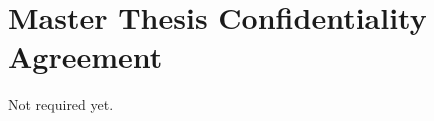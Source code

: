 \documentclass[
english,
oneside,
paper=A4,
fontsize=11pt,
BCOR=2mm,				%
DIV=default,			%
open=any,				%
listof=toc, 
bibliography=totoc,
parskip=half			%
]{Thesis} %
\begin{document}
	\section*{Master Thesis Confidentiality Agreement}	
	Not required yet.
	
	
	
	

	
	
\end{document}
